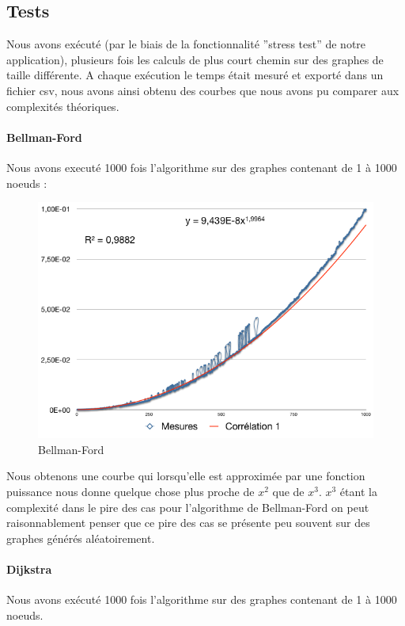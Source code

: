 \documentclass[a4paper,12pt,final] {article}
\begin{document}
\subsection{Tests}

Nous avons exécuté (par le biais de la fonctionnalité ''stress test'' de notre application), plusieurs fois les calculs de plus court chemin sur des graphes de taille différente. A chaque exécution le temps était mesuré et exporté dans un fichier csv, nous avons ainsi obtenu des courbes que nous avons pu comparer aux complexités théoriques.
\paragraph{Bellman-Ford}
Nous avons executé 1000 fois l'algorithme sur des graphes contenant de 1 à 1000 noeuds :

\begin{figure}[H]
\begin{center}
\includegraphics[scale=0.4]{bellman}
\end{center}
\caption{Bellman-Ford}
\end{figure}

Nous obtenons une courbe qui lorsqu'elle est approximée par une fonction puissance nous donne quelque chose plus proche de $x^{2}$ que de $x^{3}$. $x^{3}$ étant la complexité dans le pire des cas pour l'algorithme de Bellman-Ford on peut raisonnablement penser que ce pire des cas se présente peu souvent sur des graphes générés aléatoirement.
\paragraph{Dijkstra}
Nous avons exécuté 1000 fois l'algorithme sur des graphes contenant de 1 à 1000 noeuds.
\end{document}
